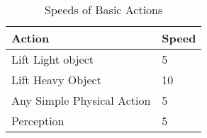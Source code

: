 \begin{table}[hb]
\centering
\caption{Speeds of Basic Actions}
	\begin{tabular}{||l|l||} \hline
    Action						& Speed \\ \hline
	Lift Light object			&	5 \\
	Lift Heavy Object           &  10 \\
	Any Simple Physical Action  &   5 \\
	Perception					&	5 \\ \hline
	\end{tabular}
\end{table}
